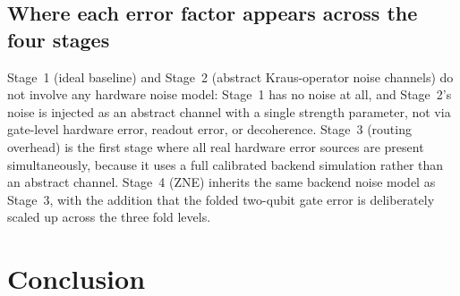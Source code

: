 \documentclass[11pt]{article}
\begin{document}
\subsection{Where each error factor appears across the four stages}

Stage~1 (ideal baseline) and Stage~2 (abstract Kraus-operator noise channels) do not involve any hardware noise model: Stage~1 has no noise at all, and Stage~2's noise is injected as an abstract channel with a single strength parameter, not via gate-level hardware error, readout error, or decoherence. Stage~3 (routing overhead) is the first stage where all real hardware error sources are present simultaneously, because it uses a full calibrated backend simulation rather than an abstract channel. Stage~4 (ZNE) inherits the same backend noise model as Stage~3, with the addition that the folded two-qubit gate error is deliberately scaled up across the three fold levels.

\begin{table}[H]
\centering
\caption{Presence of each error factor across the four stages.}
\label{tab:error-factors}
\end{table}

\section{Conclusion}
\end{document}
